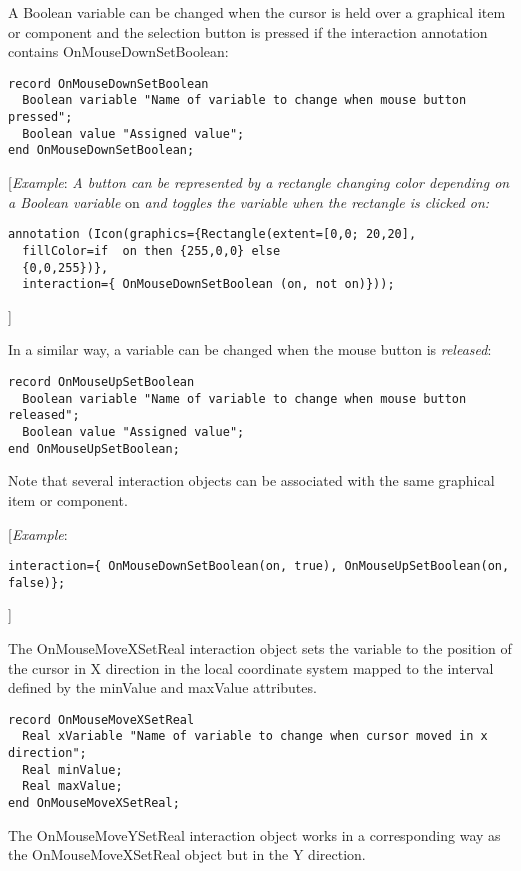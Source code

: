 A Boolean variable can be changed when the cursor is held over a
graphical item or component and the selection button is pressed if the
interaction annotation contains OnMouseDownSetBoolean:

\begin{lstlisting}[language=modelica]
record OnMouseDownSetBoolean
  Boolean variable "Name of variable to change when mouse button pressed";
  Boolean value "Assigned value";
end OnMouseDownSetBoolean;
\end{lstlisting}
{[}\emph{Example}: \emph{A button can be represented by a rectangle
changing color depending on a Boolean variable} on \emph{and toggles the
variable when the rectangle is clicked on:}

\begin{lstlisting}[language=modelica]
  annotation (Icon(graphics={Rectangle(extent=[0,0; 20,20],
  fillColor=if  on then {255,0,0} else
  {0,0,255})},
  interaction={ OnMouseDownSetBoolean (on, not on)}));
\end{lstlisting}
{]}

In a similar way, a variable can be changed when the mouse button is
\emph{released}:

\begin{lstlisting}[language=modelica]
record OnMouseUpSetBoolean
  Boolean variable "Name of variable to change when mouse button released";
  Boolean value "Assigned value";
end OnMouseUpSetBoolean;
\end{lstlisting}
Note that several interaction objects can be associated with the same
graphical item or component.

{[}\emph{Example}:
\begin{lstlisting}[language=modelica]
interaction={ OnMouseDownSetBoolean(on, true), OnMouseUpSetBoolean(on, false)};
\end{lstlisting}
{]}

The OnMouseMoveXSetReal interaction object sets the variable to the
position of the cursor in X direction in the local coordinate system
mapped to the interval defined by the minValue and maxValue attributes.

\begin{lstlisting}[language=modelica]
record OnMouseMoveXSetReal
  Real xVariable "Name of variable to change when cursor moved in x direction";
  Real minValue;
  Real maxValue;
end OnMouseMoveXSetReal;
\end{lstlisting}
The OnMouseMoveYSetReal interaction object works in a corresponding way
as the OnMouseMoveXSetReal object but in the Y direction.

